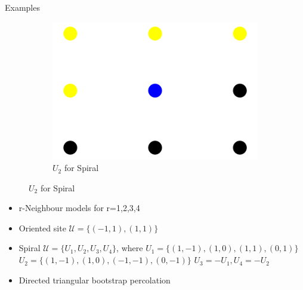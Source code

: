 \begin{frame}{Examples}
\begin{figure}
\begin{subfigure}{.2\linewidth}
    \includegraphics[width = \linewidth]{rgspiralpercrule2.png}
    \caption{$U_2$ for Spiral}
  \end{subfigure}
  	\label{fig:mesh1}
\end{figure}


\begin{itemize}
    \item r-Neighbour models for r=1,2,3,4
    \item Oriented site $\mathcal{U}=\{(-1,1),(1,1)\}$
    \item Spiral $\mathcal{U}=\{U_1,U_2,U_3,U_4\}$, where 
    $U_1=\{(1,-1),(1,0),(1,1),(0,1)\}$
    \newline
    $U_2=\{(1,-1),(1,0),(-1,-1),(0,-1)\}
    $
    \newline
    $ U_3=-U_1, U_4=-U_2$
    \item Directed triangular bootstrap percolation 
    

\end{itemize}



\end{frame}

